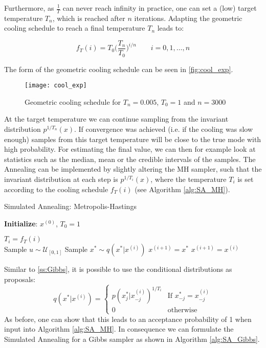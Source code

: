 Furthermore, as $\frac{1}{T}$ can never reach infinity in practice, one can set a (low) target temperature $T_n$, which is reached after $n$ iterations.
Adapting the geometric cooling schedule to reach a final temperature $T_n$ leads to:
\begin{tcolorbox}[title=Geometric Cooling Schedule (2)]
	\begin{equation}
		f_T(i) = T_0  \Big(\frac{T_n}{T_0}\Big)^{i/n} \quad \quad i = 0,1,\dots,n
	\end{equation}
\end{tcolorbox}
The form of the geometric cooling schedule can be seen in \autoref{fig:cool_exp}.
\begin{figure}
	\centering
	\texttt{[image: cool\_exp]}
	\caption{Geometric cooling schedule for $T_n=0.005$, $T_0=1$ and $n=3000$}
		
	\label{fig:cool_exp}
\end{figure}

At the target temperature we can continue sampling from the invariant distribution $p^{1/T_n}(x)$. 
If convergence was achieved (i.e. if the cooling was slow enough) samples from this target temperature will be close to the true mode with high probability.
For estimating the final value, we can then for example look at statistics such as the median, mean or the credible intervals of the samples.
The Annealing can be implemented by slightly altering the \gls{MH} sampler, such that the invariant distribution at each step is $p^{1/T_i}(x)$, where the temperature $T_i$ is set according to the cooling schedule $f_T(i)$ (see Algorithm \autoref{alg:SA_MH}).


\begin{algorithm}[H]
	\caption{Simulated Annealing: Metropolis-Hastings}\label{alg:SA_MH}
	\begin{algorithmic}
		\State \textbf{Initialize}: $x^{(0)}$, $T_0=1$
				
		\State $T_{i} = f_T(i)$
		\\
		\State Sample $u\sim \mathcal{U}_{[0,1]}$
		\State Sample $x^* \sim q(x^*|x^{(i)})$
		\State $x^{(i+1)} = x^*$
		\Else
		\State $x^{(i+1)} = x^{(i)}$
		\EndIf
		\EndFor
	\end{algorithmic}
\end{algorithm}
Similar to \autoref{ss:Gibbs}, it is possible to use the conditional distributions as proposals:
$$
q(x^*|x^{(i)}) = 
\left\{
\begin{array}{ll}
	p(x^*_j|x^{(i)}_{-j})^{1/T_i} & \text{If } x^*_{-j} = x^{(i)}_{-j} 
	\\
	0                             & \text{otherwise}                   
\end{array}
\right.
$$
As before, one can show that this leads to an acceptance probability of 1 when input into Algorithm \autoref{alg:SA_MH}.
In consequence we can formulate the Simulated Annealing for a Gibbs sampler as shown in Algorithm \autoref{alg:SA_Gibbs}.

